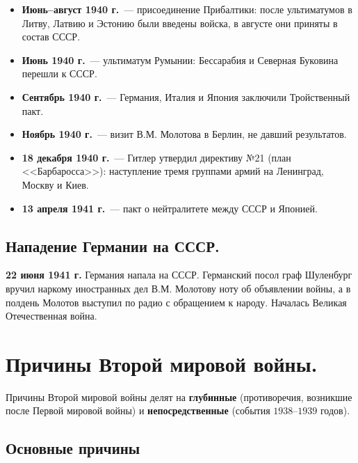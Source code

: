 \documentclass[12pt]{article}
\begin{document}
	\begin{itemize}
		\item \textbf{Июнь--август 1940 г.}~--- присоединение Прибалтики: после ультиматумов в Литву, Латвию и Эстонию были введены войска, в августе они приняты в состав СССР.
		\item \textbf{Июнь 1940 г.}~--- ультиматум Румынии: Бессарабия и Северная Буковина перешли к СССР.
		\item \textbf{Сентябрь 1940 г.}~--- Германия, Италия и Япония заключили Тройственный пакт.
		\item \textbf{Ноябрь 1940 г.}~--- визит В.М. Молотова в Берлин, не давший результатов.
		\item \textbf{18 декабря 1940 г.}~--- Гитлер утвердил директиву №21 (план <<Барбаросса>>): наступление тремя группами армий на Ленинград, Москву и Киев.
		\item \textbf{13 апреля 1941 г.}~--- пакт о нейтралитете между СССР и Японией.
	\end{itemize}

	\subsection{Нападение Германии на СССР.}

	\textbf{22 июня 1941 г.} Германия напала на СССР. Германский посол граф Шуленбург вручил наркому иностранных дел В.М. Молотову ноту об объявлении войны, а в полдень Молотов выступил по радио с обращением к народу. Началась Великая Отечественная война.

	\section{Причины Второй мировой войны.}

	\begin{note}
		Причины Второй мировой войны делят на \textbf{глубинные} (противоречия, возникшие после Первой мировой войны) и \textbf{непосредственные} (события $1938$--$1939$ годов).
	\end{note}

	\subsection{Основные причины}
\end{document}

